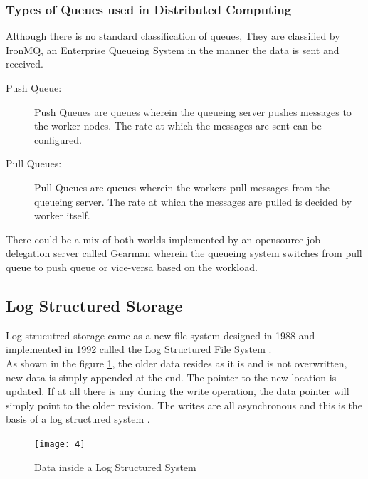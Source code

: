 \documentclass[12pt,a4paper]{article}
\begin{document}
\subsubsection{Types of Queues used in Distributed Computing}
Although there is no standard classification of queues, They are classified by IronMQ, an Enterprise Queueing System in the manner the data is sent and received.

\begin{description}
	\item [Push Queue:] 
	 		Push Queues are queues wherein the queueing server pushes messages to the
	 		worker nodes. The rate at which the messages are sent can be configured.
	\item [Pull Queues:]
			 Pull Queues are queues wherein the workers pull messages from the queueing server. The rate at which the messages are pulled is decided by worker itself.
	
\end{description}

There could be a mix of both worlds implemented by an opensource job delegation server called Gearman wherein the queueing system switches from pull queue to push queue or vice-versa based on the workload.





\subsection{Log Structured Storage}

Log strucutred storage came as a new file system designed in 1988 and implemented in 1992 called the Log Structured File System \citep{rosenblum1992design}.\\

As shown in the figure \ref{fig:gdull04}, the older data resides as it is and is not overwritten, new data is simply appended at the end. The pointer to the new location is updated. If at all there is any during the write operation, the data pointer will simply point to the older revision. The writes are all asynchronous and this is the basis of a log structured system  \citep{rosenblum1992design}. 

 \begin{figure}
 	\centering
 	\textbf{}\par\medskip
 	\texttt{[image: 4]}
 	\caption{Data inside a Log Structured System}
 	\label{fig:gdull04}
 \end{figure}
\end{document}
